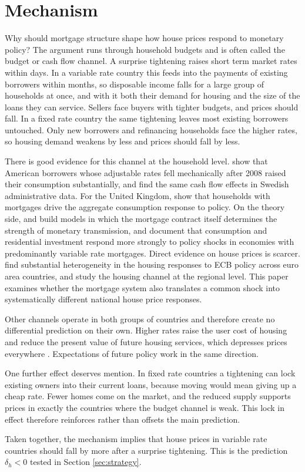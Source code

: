 \section{Mechanism}
\label{sec:mechanism}

Why should mortgage structure shape how house prices respond to monetary
policy? The argument runs through household budgets and is often called the
budget or cash flow channel. A surprise tightening raises short term market
rates within days. In a variable rate country this feeds into the payments
of existing borrowers within months, so disposable income falls for a large
group of households at once, and with it both their demand for housing and
the size of the loans they can service. Sellers face buyers with tighter
budgets, and prices should fall. In a fixed rate country the same
tightening leaves most existing borrowers untouched. Only new borrowers and
refinancing households face the higher rates, so housing demand weakens by
less and prices should fall by less.

There is good evidence for this channel at the household level.
\citet{dimaggio2017} show that American borrowers whose adjustable rates
fell mechanically after 2008 raised their consumption substantially, and
\citet{floden2021} find the same cash flow effects in Swedish
administrative data. For the United Kingdom, \citet{cloyne2020} show that
households with mortgages drive the aggregate consumption response to
policy. On the theory side, \citet{rubio2011} and \citet{garriga2017}
build models in which the mortgage contract itself determines the strength
of monetary transmission, and \citet{calza2013} document that consumption
and residential investment respond more strongly to policy shocks in
economies with predominantly variable rate mortgages. Direct evidence on
house prices is scarcer. \citet{corsetti2022} find substantial
heterogeneity in the housing responses to ECB policy across euro area
countries, and \citet{battistini2025} study the housing channel at the
regional level. This paper examines whether the mortgage system also
translates a common shock into systematically different national house
price responses.

Other channels operate in both groups of countries and therefore create no
differential prediction on their own. Higher rates raise the user cost of
housing and reduce the present value of future housing services, which
depresses prices everywhere \citep{iacoviello2005, jorda2015}. Expectations
of future policy work in the same direction.

One further effect deserves mention. In fixed rate countries a tightening
can lock existing owners into their current loans, because moving would
mean giving up a cheap rate. Fewer homes come on the market, and the
reduced supply supports prices in exactly the countries where the budget
channel is weak. This lock in effect therefore reinforces rather than
offsets the main prediction.

Taken together, the mechanism implies that house prices in variable rate
countries should fall by more after a surprise tightening. This is the
prediction $\delta_h < 0$ tested in Section \ref{sec:strategy}.
